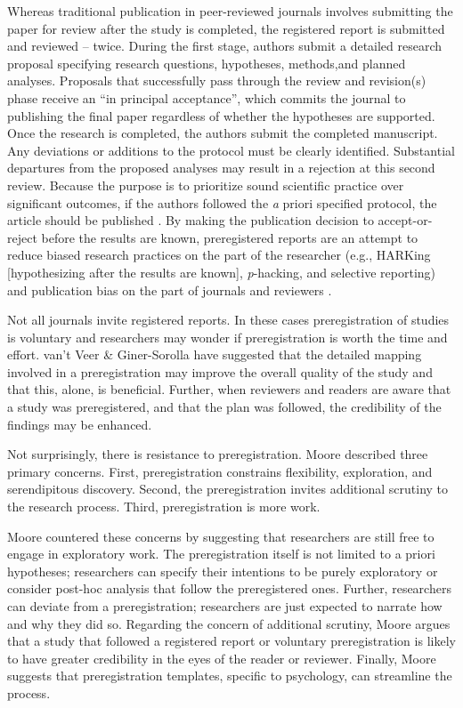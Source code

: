 \documentclass[
  11pt,
]{book}
\begin{document}
Whereas traditional publication in peer-reviewed journals involves submitting the paper for review after the study is completed, the registered report is submitted and reviewed -- twice. During the first stage, authors submit a detailed research proposal specifying research questions, hypotheses, methods,and planned analyses. Proposals that successfully pass through the review and revision(s) phase receive an ``in principal acceptance'', which commits the journal to publishing the final paper regardless of whether the hypotheses are supported. Once the research is completed, the authors submit the completed manuscript. Any deviations or additions to the protocol must be clearly identified. Substantial departures from the proposed analyses may result in a rejection at this second review. Because the purpose is to prioritize sound scientific practice over significant outcomes, if the authors followed the \emph{a} priori specified protocol, the article should be published \citep{chambers_past_2022}. By making the publication decision to accept-or-reject before the results are known, preregistered reports are an attempt to reduce biased research practices on the part of the researcher (e.g., HARKing {[}hypothesizing after the results are known{]}, \emph{p}-hacking, and selective reporting) and publication bias on the part of journals and reviewers \citep{chambers_past_2022, vant_veer_pre-registration_2016}.

Not all journals invite registered reports. In these cases preregistration of studies is voluntary and researchers may wonder if preregistration is worth the time and effort. van't Veer \& Giner-Sorolla \citeyearpar{vant_veer_pre-registration_2016} have suggested that the detailed mapping involved in a preregistration may improve the overall quality of the study and that this, alone, is beneficial. Further, when reviewers and readers are aware that a study was preregistered, and that the plan was followed, the credibility of the findings may be enhanced.

Not surprisingly, there is resistance to preregistration. Moore \citeyearpar{moore_preregister_2016} described three primary concerns. First, preregistration constrains flexibility, exploration, and serendipitous discovery. Second, the preregistration invites additional scrutiny to the research process. Third, preregistration is more work.

Moore \citeyearpar{moore_preregister_2016} countered these concerns by suggesting that researchers are still free to engage in exploratory work. The preregistration itself is not limited to a priori hypotheses; researchers can specify their intentions to be purely exploratory or consider post-hoc analysis that follow the preregistered ones. Further, researchers can deviate from a preregistration; researchers are just expected to narrate how and why they did so. Regarding the concern of additional scrutiny, Moore argues that a study that followed a registered report or voluntary preregistration is likely to have greater credibility in the eyes of the reader or reviewer. Finally, Moore suggests that preregistration templates, specific to psychology, can streamline the process.
\end{document}
